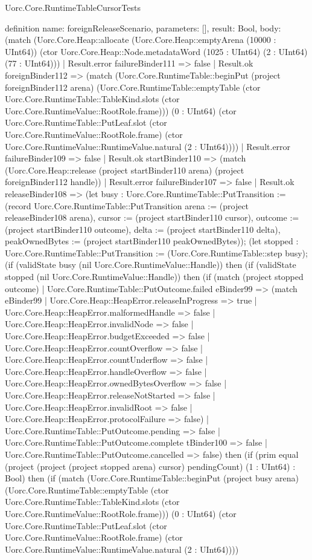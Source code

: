 \begin{lexlean}{Uorc.Core.RuntimeTableCursorTests}
\begin{semanticmodule}
definition{
  name: foreignReleaseScenario,
  parameters: [],
  result: Bool,
  body: (match (Uorc.Core.Heap::allocate (Uorc.Core.Heap::emptyArena (10000 : UInt64)) (ctor Uorc.Core.Heap::Node.metadataWord (1025 : UInt64) (2 : UInt64) (77 : UInt64)))
    | Result.error failureBinder111 => false
    | Result.ok foreignBinder112 => (match (Uorc.Core.RuntimeTable::beginPut (project foreignBinder112 arena) (Uorc.Core.RuntimeTable::emptyTable (ctor Uorc.Core.RuntimeTable::TableKind.slots (ctor Uorc.Core.RuntimeValue::RootRole.frame))) (0 : UInt64) (ctor Uorc.Core.RuntimeTable::PutLeaf.slot (ctor Uorc.Core.RuntimeValue::RootRole.frame) (ctor Uorc.Core.RuntimeValue::RuntimeValue.natural (2 : UInt64))))
      | Result.error failureBinder109 => false
      | Result.ok startBinder110 => (match (Uorc.Core.Heap::release (project startBinder110 arena) (project foreignBinder112 handle))
        | Result.error failureBinder107 => false
        | Result.ok releaseBinder108 => (let busy : Uorc.Core.RuntimeTable::PutTransition := (record Uorc.Core.RuntimeTable::PutTransition {arena := (project releaseBinder108 arena), cursor := (project startBinder110 cursor), outcome := (project startBinder110 outcome), delta := (project startBinder110 delta), peakOwnedBytes := (project startBinder110 peakOwnedBytes)}); (let stopped : Uorc.Core.RuntimeTable::PutTransition := (Uorc.Core.RuntimeTable::step busy); (if (validState busy (nil Uorc.Core.RuntimeValue::Handle)) then (if (validState stopped (nil Uorc.Core.RuntimeValue::Handle)) then (if (match (project stopped outcome)
          | Uorc.Core.RuntimeTable::PutOutcome.failed eBinder99 => (match eBinder99
            | Uorc.Core.Heap::HeapError.releaseInProgress => true
            | Uorc.Core.Heap::HeapError.malformedHandle => false
            | Uorc.Core.Heap::HeapError.invalidNode => false
            | Uorc.Core.Heap::HeapError.budgetExceeded => false
            | Uorc.Core.Heap::HeapError.countOverflow => false
            | Uorc.Core.Heap::HeapError.countUnderflow => false
            | Uorc.Core.Heap::HeapError.handleOverflow => false
            | Uorc.Core.Heap::HeapError.ownedBytesOverflow => false
            | Uorc.Core.Heap::HeapError.releaseNotStarted => false
            | Uorc.Core.Heap::HeapError.invalidRoot => false
            | Uorc.Core.Heap::HeapError.protocolFailure => false)
          | Uorc.Core.RuntimeTable::PutOutcome.pending => false
          | Uorc.Core.RuntimeTable::PutOutcome.complete tBinder100 => false
          | Uorc.Core.RuntimeTable::PutOutcome.cancelled => false) then (if (prim equal (project (project (project stopped arena) cursor) pendingCount) (1 : UInt64) : Bool) then (if (match (Uorc.Core.RuntimeTable::beginPut (project busy arena) (Uorc.Core.RuntimeTable::emptyTable (ctor Uorc.Core.RuntimeTable::TableKind.slots (ctor Uorc.Core.RuntimeValue::RootRole.frame))) (0 : UInt64) (ctor Uorc.Core.RuntimeTable::PutLeaf.slot (ctor Uorc.Core.RuntimeValue::RootRole.frame) (ctor Uorc.Core.RuntimeValue::RuntimeValue.natural (2 : UInt64))))
}
\end{semanticmodule}
\end{lexlean}
